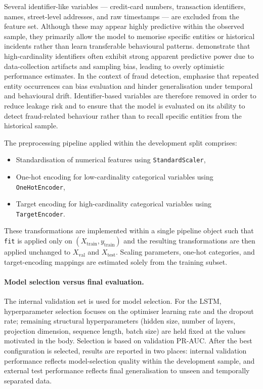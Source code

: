 \documentclass[oneside,12pt,parskip=half,american,numbers=noenddot]{scrreprt}
\begin{document}
Several identifier-like variables — credit-card numbers, transaction identifiers, names, street-level addresses, and raw timestamps — are excluded from the feature set. Although these may appear highly predictive within the observed sample, they primarily allow the model to memorise specific entities or historical incidents rather than learn transferable behavioural patterns. \textcite{kaufman_leakage_2012} demonstrate that high-cardinality identifiers often exhibit strong apparent predictive power due to data-collection artifacts and sampling bias, leading to overly optimistic performance estimates. In the context of fraud detection, \textcite{dal_pozzolo_credit_2015} emphasise that repeated entity occurrences can bias evaluation and hinder generalisation under temporal and behavioural drift. Identifier-based variables are therefore removed in order to reduce leakage risk and to ensure that the model is evaluated on its ability to detect fraud-related behaviour rather than to recall specific entities from the historical sample.

The preprocessing pipeline applied within the development split comprises:
\begin{itemize}
    \item Standardisation of numerical features using \texttt{StandardScaler},
    \item One-hot encoding for low-cardinality categorical variables using \texttt{OneHotEncoder},
    \item Target encoding for high-cardinality categorical variables using \texttt{TargetEncoder}.
\end{itemize}
These transformations are implemented within a single pipeline object such that \texttt{fit} is applied only on $(X_{\text{train}}, y_{\text{train}})$ and the resulting transformations are then applied unchanged to $X_{\text{val}}$ and $X_{\text{test}}$. Scaling parameters, one-hot categories, and target-encoding mappings are estimated solely from the training subset.

\paragraph{Model selection versus final evaluation.} The internal validation set is used for model selection. For the LSTM, hyperparameter selection focuses on the optimiser learning rate and the dropout rate; remaining structural hyperparameters (hidden size, number of layers, projection dimension, sequence length, batch size) are held fixed at the values motivated in the body. Selection is based on validation PR-AUC. After the best configuration is selected, results are reported in two places: internal validation performance reflects model-selection quality within the development sample, and external test performance reflects final generalisation to unseen and temporally separated data.
\end{document}
